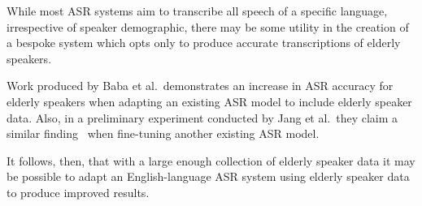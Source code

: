 While most ASR systems aim to transcribe all speech of a specific language, irrespective of
speaker demographic, there may be some utility in the creation of a bespoke system which opts
only to produce accurate transcriptions of elderly speakers.

Work produced by Baba et al.\ demonstrates an increase in ASR accuracy for elderly speakers when
adapting an existing ASR model to include elderly speaker data\cite{baba2004}.
Also, in a preliminary experiment conducted by Jang et al.\ they claim a similar
finding~\cite{vote400} when fine-tuning another existing ASR model.

It follows, then, that with a large enough collection of elderly speaker data it may be possible
to adapt an English-language ASR system using elderly speaker data to produce improved results.